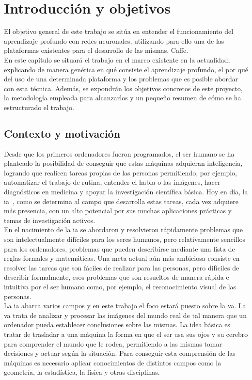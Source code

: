 \chapter{Introducción y objetivos}\label{cap.introduccion}
El objetivo general de este trabajo se sitúa en  entender el funcionamiento del aprendizaje profundo con redes neuronales, utilizando para ello una de las plataformas existentes para el desarrollo de las mismas, Caffe.\\

En este capítulo se situará el trabajo en el marco existente en la actualidad, explicando de manera genérica en qué consiste el aprendizaje profundo, el por qué del uso de una determinada plataforma y los problemas que es posible abordar con esta técnica. Además, se expondrán los objetivos concretos de este proyecto, la metodología empleada para alcanzarlos y un pequeño resumen de cómo se ha estructurado el trabajo.

\section{Contexto y motivación}

Desde que los primeros ordenadores fueron programados, el ser humano se ha planteado la posibilidad de conseguir que estas máquinas adquieran inteligencia, logrando que realicen tareas propias de las personas permitiendo, por ejemplo, automatizar el trabajo de rutina, entender el habla o las imágenes, hacer diagnósticos en medicina y apoyar la investigación científica básica. Hoy en día, la \acrfull{ia}~\cite{Goodfellow-et-al-2016}, como se determina al campo que desarrolla estas tareas, cada vez adquiere más presencia, con un alto potencial por sus muchas aplicaciones prácticas y temas de investigación activos.\\

En el nacimiento de la \acrshort{ia} se abordaron y resolvieron rápidamente problemas que son intelectualmente difíciles para los seres humanos, pero relativamente sencillos para los ordenadores, problemas que pueden describirse mediante una lista de reglas formales y matemáticas. Una meta actual aún más ambiciosa consiste en resolver las tareas que son fáciles de realizar para las personas, pero difíciles de describir formalmente, esos problemas que son resueltos de manera rápida e intuitiva por el ser humano como, por ejemplo, el reconocimiento visual de las personas.\\

La {ia} abarca varios campos y en este trabajo el foco estará puesto sobre la \acrfull{va}. La \acrshort{va} trata de analizar y procesar las imágenes del mundo real de tal manera que un ordenador pueda establecer conclusiones sobre las mismas. La idea básica es tratar de trasladar a una máquina la forma en que el ser usa sus ojos y su cerebro para comprender el mundo que le rodea, permitiendo a las mismas tomar decisiones y actuar según la situación. Para conseguir esta comprensión de las máquinas es necesario aplicar conocimientos de distintos campos como la geometría, la estadística, la física y otras disciplinas.\\

